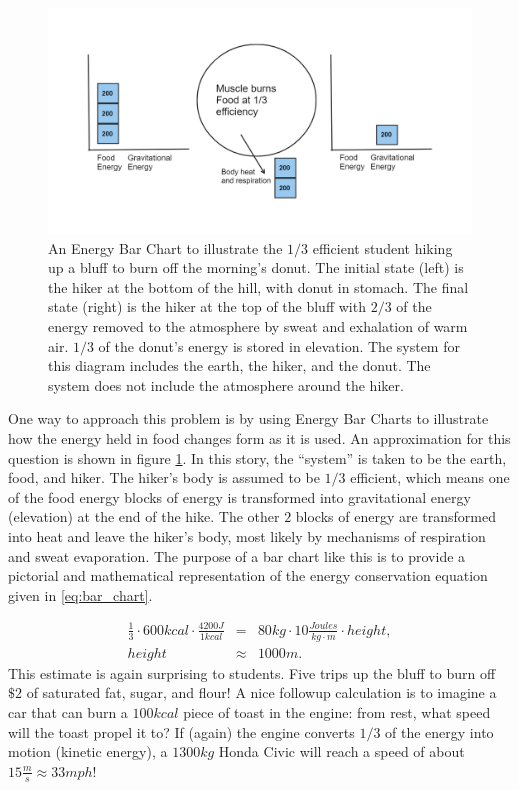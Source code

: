 \documentclass[prb,preprint]{revtex4-2}
\newcommand{\bea}{\begin{eqnarray}}
\newcommand{\eea}{\end{eqnarray}}
\begin{document}
\begin{figure}[h]
\centering
\includegraphics[width=\columnwidth]{bar_chart.png}
\caption{An Energy Bar Chart to illustrate the $1/3$ efficient student hiking up a bluff to burn off the morning's donut.  The initial state (left) is the hiker at the bottom of the hill, with donut in stomach.  The final state (right) is the hiker at the top of the bluff with $2/3$ of the energy removed to the atmosphere by sweat and exhalation of warm air. $1/3$ of the donut's energy is stored in elevation.  The system for this diagram includes the earth, the hiker, and the donut.  The system does not include the atmosphere around the hiker.  
}
\label{bar_chart}
\end{figure}

One way to approach this problem is by using Energy Bar Charts\cite{energy_bar_charts} to illustrate how the energy held in food changes form as it is used.  An approximation for this question is shown in figure \ref{bar_chart}.  
In this story, the ``system'' is taken to be the earth, food, and hiker.  The hiker's body is assumed to be $1/3$ efficient, which means one of the food energy blocks of energy is transformed into gravitational energy (elevation) at the end of the hike.  
The other $2$ blocks of energy are transformed into heat and leave the hiker's body, most likely by mechanisms of respiration and sweat evaporation. The purpose of a bar chart like this is to provide a pictorial and mathematical representation of the energy conservation equation given in \ref{eq:bar_chart}.         

\bea
\frac{1}{3}\cdot600kcal\cdot\frac{4200J}{1kcal} 
	&=& 80kg\cdot10\frac{Joules}{kg\cdot m}\cdot height , \label{eq:bar_chart}\\
height &\approx&  1000 m .
\eea
This estimate is again surprising to students.  Five trips up the bluff to burn off $\$2$ of saturated fat, sugar, and flour!  A nice followup calculation is to imagine a car that can burn a $100kcal$ piece of toast in the engine: from rest, what speed will the toast propel it to? If (again) the engine converts $1/3$ of the energy into motion (kinetic energy), a $1300kg$ Honda Civic will reach a speed of about $15\frac{m}{s}\approx33mph$!  
\end{document}
